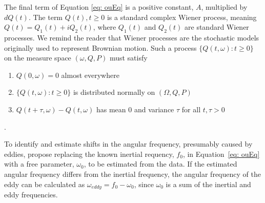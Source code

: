 \documentclass{stat572Style}
\begin{document}
 The final term of Equation \eqref{eq: ouEq} is a positive constant, $A$, multiplied by $dQ(t)$.  The term $Q(t), t \geq 0$ is a standard complex Wiener process,  meaning $Q(t) = Q_{1}(t) + i Q_{2}(t)$, where $Q_{1}(t)$ and $Q_{2}(t)$ are standard Wiener processes.
 We remind the reader that Wiener processes are the stochastic models originally used to represent Brownian motion. 
  Such a process $\{Q(t, \omega): t \geq 0\}$ on the measure space $(\omega, Q, P)$ must satisfy
\begin{enumerate}
\item $Q(0, \omega) = 0$ almost everywhere
\item $\{Q(t, \omega): t \geq 0\}$ is distributed normally on $(\Omega,Q, P)$
\item $Q(t + \tau, \omega) - Q(t, \omega)$ has mean 0 and variance $\tau$ for all $t, \tau > 0$
\end{enumerate}
\citep{Hida1980}. 

To identify and estimate shifts in the angular frequency, presumably caused by eddies, \citet{Sykulski2016} propose replacing the known inertial requency, $f_{0}$,  in Equation~\eqref{eq: ouEq} with  a free parameter, $\omega_{0}$, to be estimated  from the data. 
If the estimated angular frequency differs from the inertial frequency, the angular frequency of the eddy can be calculated as $\omega_{eddy} = f_{0} - \omega_{0}$, since $\omega_{0}$ is a sum of the inertial and eddy frequencies.
\end{document}
